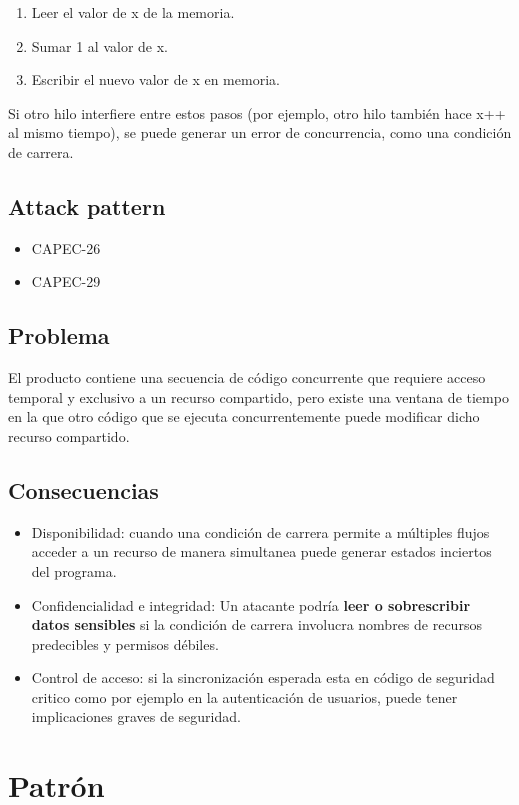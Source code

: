     \begin{enumerate}
        \item Leer el valor de x de la memoria.
        \item Sumar 1 al valor de x.
        \item Escribir el nuevo valor de x en memoria.
    \end{enumerate}
    
    Si otro hilo interfiere entre estos pasos (por ejemplo, otro hilo también hace x++ al mismo tiempo), se puede generar un error de concurrencia, como una condición de carrera.
\subsection*{Attack pattern}
\begin{itemize}
    \item CAPEC-26
    \item CAPEC-29
\end{itemize}
\subsection*{Problema}
El producto contiene una secuencia de código concurrente que requiere acceso temporal y exclusivo a un recurso compartido, pero existe una ventana de tiempo en la que otro código que se ejecuta concurrentemente puede modificar dicho recurso compartido.
\subsection*{Consecuencias}
\begin{itemize}
    \item Disponibilidad: cuando una condición de carrera permite a múltiples flujos acceder a un recurso de manera simultanea puede generar estados inciertos del programa.
    \item Confidencialidad e integridad: Un atacante podría \textbf{leer o sobrescribir datos sensibles} si la condición de carrera involucra nombres de recursos predecibles y permisos débiles.
    \item Control de acceso: si la sincronización esperada esta en código de seguridad critico como por ejemplo en la autenticación de usuarios, puede tener implicaciones graves de seguridad.
\end{itemize}

\section{Patrón}

